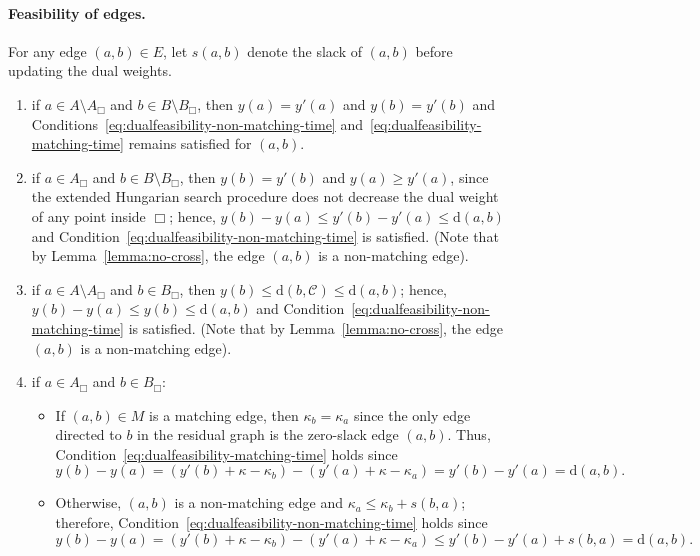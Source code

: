 \documentclass[11pt,onecolumn]{article}
\def\mcC{{\mathcal{C}}}
\newcommand{\cell}{\Box}
\newcommand{\distance}[2]{\mathrm{d}(#1, #2)}
\newcommand\myparagraph[1]{\paragraph{#1}}
\begin{document}
    \myparagraph{Feasibility of edges.} For any edge $(a,b)\in E$, let $s(a,b)$ denote the slack of $(a,b)$ before updating the dual weights. 
    \begin{enumerate}
        \item if $a\in A\setminus A_\cell$ and $b\in B\setminus B_\cell$, then $y(a)=y'(a)$ and $y(b)=y'(b)$ and Conditions~\eqref{eq:dualfeasibility-non-matching-time} and~\eqref{eq:dualfeasibility-matching-time} remains satisfied for $(a,b)$.
        
        \item if $a\in A_\cell$ and $b\in B\setminus B_\cell$, then $y(b)=y'(b)$ and $y(a)\ge y'(a)$, since the extended Hungarian search procedure does not decrease the dual weight of any point inside $\cell$; hence, $y(b)-y(a)\le y'(b)-y'(a)\le \distance{a}{b}$ and Condition~\eqref{eq:dualfeasibility-non-matching-time} is satisfied. (Note that by Lemma~\ref{lemma:no-cross}, the edge $(a,b)$ is a non-matching edge).

        \item if $a\in A\setminus A_\cell$ and $b\in B_\cell$, then $y(b)\le \distance{b}{\mcC}\le \distance{a}{b}$; hence, $y(b)-y(a)\le y(b)\le \distance{a}{b}$ and Condition~\eqref{eq:dualfeasibility-non-matching-time} is satisfied. (Note that by Lemma~\ref{lemma:no-cross}, the edge $(a,b)$ is a non-matching edge).

        \item if $a\in A_\cell$ and $b\in B_\cell$: 
        \begin{itemize}
            \item If $(a,b)\in M$ is a matching edge, then $\kappa_b = \kappa_a$ since the only edge directed to $b$ in the residual graph is the zero-slack edge $(a,b)$. Thus, Condition~\eqref{eq:dualfeasibility-matching-time} holds since
            \begin{equation*}
            y(b) - y(a) = (y'(b)+\kappa-\kappa_b) - (y'(a)+\kappa-\kappa_a) = y'(b)-y'(a) = \distance{a}{b}.
            \end{equation*}
            \item Otherwise, $(a,b)$ is a non-matching edge and $\kappa_a\le \kappa_b + s(b,a)$; therefore, Condition~\eqref{eq:dualfeasibility-non-matching-time} holds since
            \begin{equation}\label{eq:global-hung-1}
                y(b)-y(a) = (y'(b)+\kappa-\kappa_b) - (y'(a)+\kappa-\kappa_a) \le y'(b)-y'(a) + s(b,a) = \distance{a}{b}.
            \end{equation}
        \end{itemize}
    \end{enumerate}
    
\end{document}
